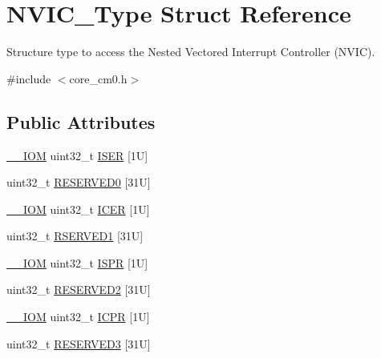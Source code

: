 \hypertarget{struct_n_v_i_c___type}{}\section{N\+V\+I\+C\+\_\+\+Type Struct Reference}
\label{struct_n_v_i_c___type}


Structure type to access the Nested Vectored Interrupt Controller (N\+V\+IC).  




{\ttfamily \#include $<$core\+\_\+cm0.\+h$>$}

\subsection*{Public Attributes}
\begin{DoxyCompactItemize}
\item 
\hyperlink{core__sc300_8h_ab6caba5853a60a17e8e04499b52bf691}{\+\_\+\+\_\+\+I\+OM} uint32\+\_\+t \hyperlink{struct_n_v_i_c___type_ab1d578f3fd82d9d7ba937488721c57a3}{I\+S\+ER} \mbox{[}1\+U\mbox{]}
\item 
uint32\+\_\+t \hyperlink{struct_n_v_i_c___type_a55b94454a8fcf459a284ec24bc7d3057}{R\+E\+S\+E\+R\+V\+E\+D0} \mbox{[}31\+U\mbox{]}
\item 
\hyperlink{core__sc300_8h_ab6caba5853a60a17e8e04499b52bf691}{\+\_\+\+\_\+\+I\+OM} uint32\+\_\+t \hyperlink{struct_n_v_i_c___type_a42e4007004da61e226adb251ac73f586}{I\+C\+ER} \mbox{[}1\+U\mbox{]}
\item 
uint32\+\_\+t \hyperlink{struct_n_v_i_c___type_a5c5d25b019ac644044623a188ae20c4c}{R\+S\+E\+R\+V\+E\+D1} \mbox{[}31\+U\mbox{]}
\item 
\hyperlink{core__sc300_8h_ab6caba5853a60a17e8e04499b52bf691}{\+\_\+\+\_\+\+I\+OM} uint32\+\_\+t \hyperlink{struct_n_v_i_c___type_a78a829d7fa59290031fedbc95af35825}{I\+S\+PR} \mbox{[}1\+U\mbox{]}
\item 
uint32\+\_\+t \hyperlink{struct_n_v_i_c___type_a54f3c01b4b876ea7b3e0e8c3a9e9dfaf}{R\+E\+S\+E\+R\+V\+E\+D2} \mbox{[}31\+U\mbox{]}
\item 
\hyperlink{core__sc300_8h_ab6caba5853a60a17e8e04499b52bf691}{\+\_\+\+\_\+\+I\+OM} uint32\+\_\+t \hyperlink{struct_n_v_i_c___type_acf8209acf3f339d8eb2df9d3faaa10ae}{I\+C\+PR} \mbox{[}1\+U\mbox{]}
\item 
uint32\+\_\+t \hyperlink{struct_n_v_i_c___type_a3a0022743541fcf7385584dab63189ce}{R\+E\+S\+E\+R\+V\+E\+D3} \mbox{[}31\+U\mbox{]}
\item 

\end{DoxyCompactItemize}

